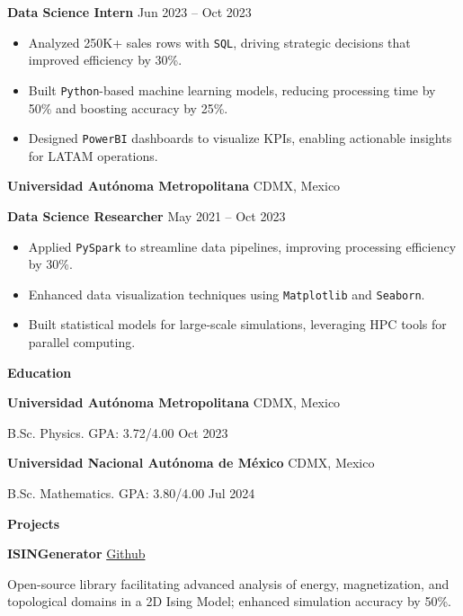 \documentclass[6pt]{article}
\begin{document}
\textbf{Data Science Intern} \hfill Jun 2023 -- Oct 2023
\begin{itemize}[noitemsep, topsep=0pt, partopsep=0pt, parsep=0pt]
    \item Analyzed 250K+ sales rows with \texttt{SQL}, driving strategic decisions that improved efficiency by 30\%.
    \item Built \texttt{Python}-based machine learning models, reducing processing time by 50\% and boosting accuracy by 25\%.
    \item Designed \texttt{PowerBI} dashboards to visualize KPIs, enabling actionable insights for LATAM operations.
\end{itemize}
\vspace{5pt}
\textbf{Universidad Aut\'onoma Metropolitana} \hfill CDMX, Mexico

\textbf{Data Science Researcher} \hfill May 2021 -- Oct 2023
\begin{itemize}[noitemsep, topsep=0pt, partopsep=0pt, parsep=0pt]
    \item Applied \texttt{PySpark} to streamline data pipelines, improving processing efficiency by 30\%.
    \item Enhanced data visualization techniques using \texttt{Matplotlib} and \texttt{Seaborn}.
    \item Built statistical models for large-scale simulations, leveraging HPC tools for parallel computing.
\end{itemize}
\vspace{10pt}
\begin{center}
    \textbf{Education}
\end{center}

\textbf{Universidad Aut\'onoma Metropolitana} \hfill CDMX, Mexico

B.Sc. Physics. GPA: 3.72/4.00 \hfill Oct 2023

\textbf{Universidad Nacional Aut\'onoma de M\'exico} \hfill CDMX, Mexico

B.Sc. Mathematics. GPA: 3.80/4.00 \hfill Jul 2024

\vspace{10pt}
\begin{center}
    \textbf{Projects}
\end{center}
\textbf{ISINGenerator} \hfill \href{https://github.com/erick-rios/ISINGenerator}{Github}

Open-source library facilitating advanced analysis of energy, magnetization, and topological domains in a 2D Ising Model; enhanced simulation accuracy by 50\%.
\end{document}
